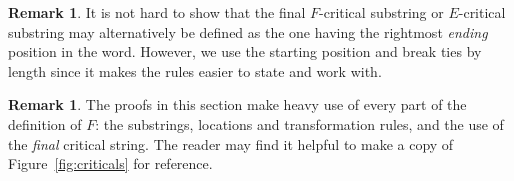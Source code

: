 \documentclass[10pt]{amsart}
\theoremstyle{definition}
\newtheorem{rema}[theorem]{Remark}
\begin{document}
\begin{rema}
It is not hard to show that the final $F$-critical substring or $E$-critical substring may alternatively be defined as the one having the rightmost \emph{ending} position in the word. However, we use the starting position and break ties by length since it makes the rules easier to state and work with.
\end{rema}

\begin{rema}
The proofs in this section make heavy use of every part of the definition of $F$: the substrings, locations and transformation rules, and the use of the \emph{final} critical string. The reader may find it helpful to make a copy of Figure~\ref{fig:criticals} for reference.
\end{rema}
\end{document}
